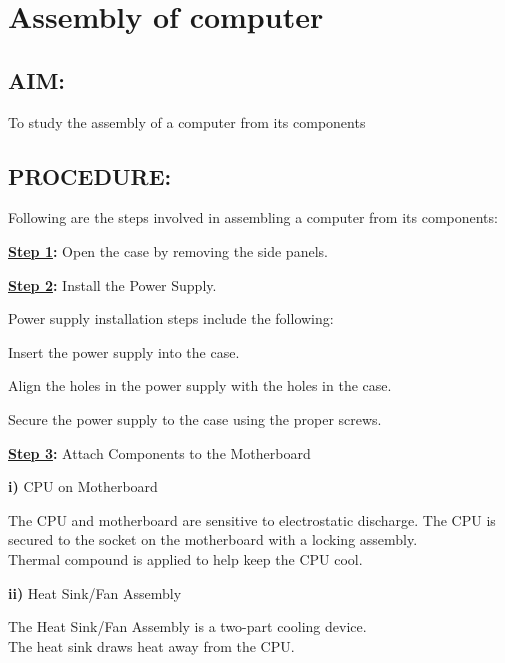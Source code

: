 \documentclass[a4paper,28pt]{report}
\begin{document}
%
%
%
\chapter{Assembly of computer}
%
%
%
%
\section*{AIM:}
To study the assembly of a computer from its components
\section*{PROCEDURE:}
Following are the steps involved in assembling a computer from its components:

\textbf{\underline{Step 1}:} Open the case by removing the side panels.


\textbf{\underline{Step 2}:} Install the Power Supply.

\hspace{40pt}Power supply installation steps include the following:

\hspace{40pt}Insert the power supply into the case.

\hspace{40pt}Align the holes in the power supply with the holes in the case.

\hspace{40pt}Secure the power supply to the case using the proper screws.


\textbf{\underline{Step 3}:} Attach Components to the Motherboard

\hspace{40pt}\textbf{i)} CPU on Motherboard

\hspace{50pt}The CPU and motherboard are sensitive to electrostatic discharge.
\newline
\hspace*{50pt}The CPU is secured to the socket on the motherboard with a locking assembly.
\\\hspace*{50pt}Thermal compound is applied to help keep the CPU cool.

\hspace{40pt}\textbf{ii)} Heat Sink/Fan Assembly

\hspace{50pt}  The Heat Sink/Fan Assembly is a two-part cooling device.
\\\hspace*{50pt}  The heat sink draws heat away from the CPU.
\end{document}
